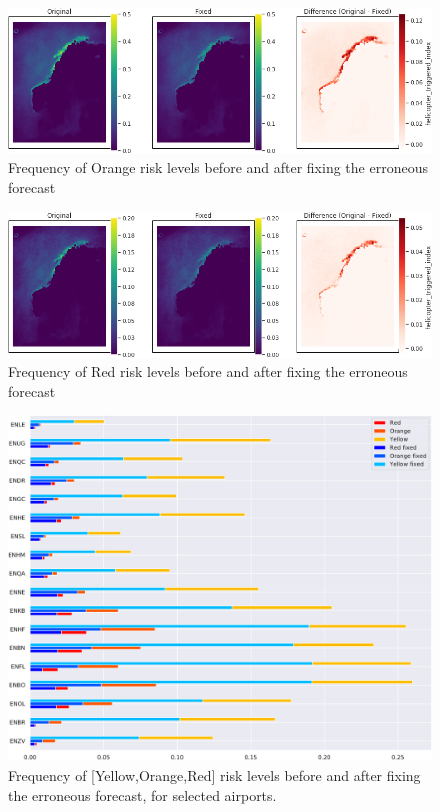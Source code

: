 \begin{figure}
    \centering
    \includegraphics[width=\textwidth]{Figures/climatologyorange.png}
    \caption{Frequency of Orange risk levels before and after fixing the erroneous forecast}
    \label{fig:fixorange}
\end{figure}

\begin{figure}
    \centering
    \includegraphics[width=\textwidth]{Figures/climatologyred.png}
    \caption{Frequency of Red risk levels before and after fixing the erroneous forecast}
    \label{fig:fixyellow}
\end{figure}

\begin{figure}
    \centering
    \includegraphics[width=\textwidth]{Figures/fixeffect.pdf}
    \caption{Frequency of [Yellow,Orange,Red] risk levels before and after fixing the erroneous forecast, for selected airports.}
    \label{fig:fixeffect}
\end{figure}


